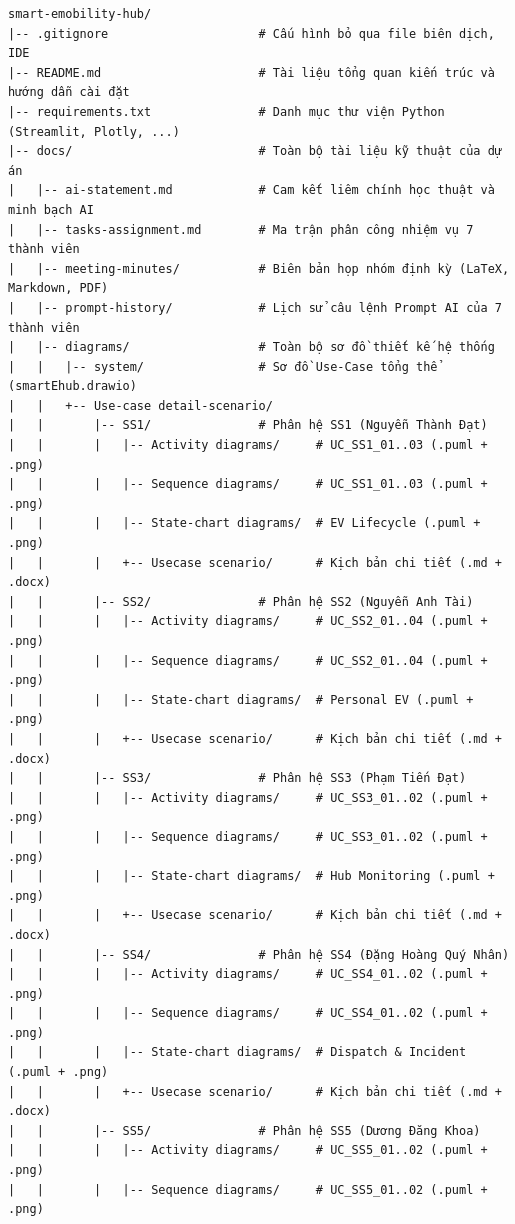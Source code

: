 \documentclass[12pt,a4paper]{article}
\begin{document}
{\scriptsize
\begin{verbatim}
smart-emobility-hub/
|-- .gitignore                     # Cấu hình bỏ qua file biên dịch, IDE
|-- README.md                      # Tài liệu tổng quan kiến trúc và hướng dẫn cài đặt
|-- requirements.txt               # Danh mục thư viện Python (Streamlit, Plotly, ...)
|-- docs/                          # Toàn bộ tài liệu kỹ thuật của dự án
|   |-- ai-statement.md            # Cam kết liêm chính học thuật và minh bạch AI
|   |-- tasks-assignment.md        # Ma trận phân công nhiệm vụ 7 thành viên
|   |-- meeting-minutes/           # Biên bản họp nhóm định kỳ (LaTeX, Markdown, PDF)
|   |-- prompt-history/            # Lịch sử câu lệnh Prompt AI của 7 thành viên
|   |-- diagrams/                  # Toàn bộ sơ đồ thiết kế hệ thống
|   |   |-- system/                # Sơ đồ Use-Case tổng thể (smartEhub.drawio)
|   |   +-- Use-case detail-scenario/
|   |       |-- SS1/               # Phân hệ SS1 (Nguyễn Thành Đạt)
|   |       |   |-- Activity diagrams/     # UC_SS1_01..03 (.puml + .png)
|   |       |   |-- Sequence diagrams/     # UC_SS1_01..03 (.puml + .png)
|   |       |   |-- State-chart diagrams/  # EV Lifecycle (.puml + .png)
|   |       |   +-- Usecase scenario/      # Kịch bản chi tiết (.md + .docx)
|   |       |-- SS2/               # Phân hệ SS2 (Nguyễn Anh Tài)
|   |       |   |-- Activity diagrams/     # UC_SS2_01..04 (.puml + .png)
|   |       |   |-- Sequence diagrams/     # UC_SS2_01..04 (.puml + .png)
|   |       |   |-- State-chart diagrams/  # Personal EV (.puml + .png)
|   |       |   +-- Usecase scenario/      # Kịch bản chi tiết (.md + .docx)
|   |       |-- SS3/               # Phân hệ SS3 (Phạm Tiến Đạt)
|   |       |   |-- Activity diagrams/     # UC_SS3_01..02 (.puml + .png)
|   |       |   |-- Sequence diagrams/     # UC_SS3_01..02 (.puml + .png)
|   |       |   |-- State-chart diagrams/  # Hub Monitoring (.puml + .png)
|   |       |   +-- Usecase scenario/      # Kịch bản chi tiết (.md + .docx)
|   |       |-- SS4/               # Phân hệ SS4 (Đặng Hoàng Quý Nhân)
|   |       |   |-- Activity diagrams/     # UC_SS4_01..02 (.puml + .png)
|   |       |   |-- Sequence diagrams/     # UC_SS4_01..02 (.puml + .png)
|   |       |   |-- State-chart diagrams/  # Dispatch & Incident (.puml + .png)
|   |       |   +-- Usecase scenario/      # Kịch bản chi tiết (.md + .docx)
|   |       |-- SS5/               # Phân hệ SS5 (Dương Đăng Khoa)
|   |       |   |-- Activity diagrams/     # UC_SS5_01..02 (.puml + .png)
|   |       |   |-- Sequence diagrams/     # UC_SS5_01..02 (.puml + .png)

\end{verbatim}}
\end{document}
